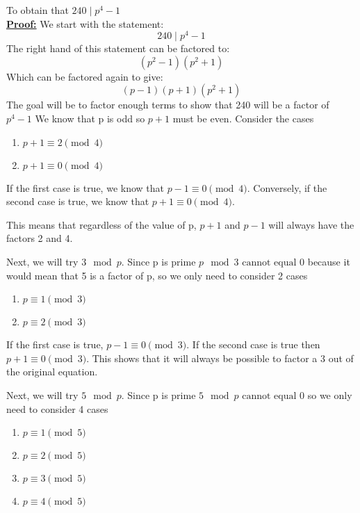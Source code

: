 \documentclass{article}
\begin{document}
To obtain that $240 \mid p^4-1$
\\
\underline{\textbf{Proof:}}
We start with the statement:
\begin{equation*}
    240 \mid p^4-1
\end{equation*}
The right hand of this statement can be factored to:
\begin{equation*}
    (p^2-1)(p^2+1)
\end{equation*}
Which can be factored again to give:
\begin{equation*}
    (p-1)(p+1)(p^2+1)
\end{equation*}
The goal will be to factor enough terms to show that 240 will be a factor of $p^4-1$
We know that p is odd so $p+1$ must be even.
Consider the cases 
\begin{enumerate}
    \item$p+1 \equiv 2 \pmod{4}$
    \item$p+1 \equiv 0 \pmod{4}$
\end{enumerate}

If the first case is true, we know that $p-1 \equiv 0 \pmod{4}$.
Conversely, if the second case is true, we know that $p+1 \equiv 0 \pmod{4}$.

This means that regardless of the value of p, $p + 1 $ and $p-1$ will always have the factors 2 and 4.\cite{Star}

Next, we will try $3 \mod p$. Since p is prime $p\mod 3 \text{ cannot equal } 0$ because it would mean that 5 is a factor of p, so we only need to consider 2 cases

\begin{enumerate}
    \item$p \equiv 1 \pmod{3}$
    \item$p \equiv 2 \pmod{3}$
\end{enumerate}

If the first case is true, $p-1 \equiv 0 \pmod{3}$. If the second case is true then $p+1 \equiv 0 \pmod{3}$. This shows that it will always be possible to factor a 3 out of the original equation.


Next, we will try $5 \mod p$. Since p is prime $5\mod p \text{ cannot equal } 0$ so we only need to consider 4 cases
\begin{enumerate}
    \item$p \equiv 1 \pmod{5}$
    \item$p \equiv 2 \pmod{5}$
    \item$p \equiv 3 \pmod{5}$
    \item$p \equiv 4 \pmod{5}$
\end{enumerate}
\end{document}
